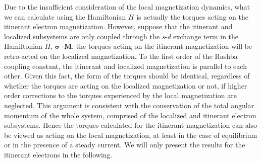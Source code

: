 \documentclass[12pt]{iopart}
\begin{document}
Due to the insufficient consideration of the local magnetization dynamics, what we can calculate using the Hamiltonian $H$ is actually the torques acting on the itinerant electron magnetization. However, suppose that the itinerant and localized subsystems are only coupled through the \textit{s}-\textit{d} exchange term in the Hamiltonian $H$, $\bm{\sigma} \cdot \textbf{M}$, the torques acting on the itinerant magnetization will be retro-acted on the localized magnetization. To the first order of the Rashba coupling constant, the itinerant and localized magnetization is parallel to each other. Given this fact, the form of the torques should be identical, regardless of whether the torques are acting on the localized magnetization or not, if higher order corrections to the torques experienced by the local magnetization are neglected. This argument is consistent with the conservation of the total angular momentum of the whole system, comprised of the localized and itinerant electron subsystems. Hence the torques calculated for the itinerant magnetization can also be viewed as acting on the local magnetization, at least in the case of equilibrium or in the presence of a steady current. We will only present the results for the itinerant electrons in the following.
\end{document}
